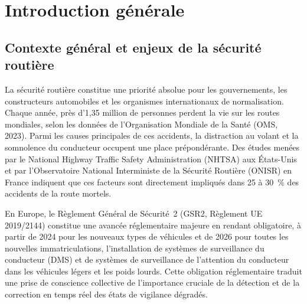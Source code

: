 \documentclass[12pt,a4paper]{report}
\begin{document}
\clearpage

\setcounter{page}{1}

\tableofcontents
\clearpage

\listoffigures
\clearpage

\listoftables
\clearpage

\lstlistoflistings
\clearpage

\setcounter{page}{1}


\chapter{Introduction g\'en\'erale}

\section{Contexte g\'en\'eral et enjeux de la s\'ecurit\'e routi\`ere}

La s\'ecurit\'e routi\`ere constitue une priorit\'e absolue pour les gouvernements, les constructeurs automobiles et les organismes internationaux de normalisation. Chaque ann\'ee, pr\`es d'1,35 million de personnes perdent la vie sur les routes mondiales, selon les donn\'ees de l'Organisation Mondiale de la Sant\'e (OMS, 2023). Parmi les causes principales de ces accidents, la distraction au volant et la somnolence du conducteur occupent une place pr\'epond\'erante. Des \'etudes men\'ees par le National Highway Traffic Safety Administration (NHTSA) aux \'Etats-Unis et par l'Observatoire National Interministe de la S\'ecurit\'e Routi\`ere (ONISR) en France indiquent que ces facteurs sont directement impliqu\'es dans 25 \`a 30~\% des accidents de la route mortels.

En Europe, le R\`eglement G\'en\'eral de S\'ecurit\'e~2 (GSR2, R\`eglement UE 2019/2144) constitue une avanc\'ee r\'eglementaire majeure en rendant obligatoire, \`a partir de 2024 pour les nouveaux types de v\'ehicules et de 2026 pour toutes les nouvelles immatriculations, l'installation de syst\`emes de surveillance du conducteur (DMS) et de syst\`emes de surveillance de l'attention du conducteur dans les v\'ehicules l\'egers et les poids lourds. Cette obligation r\'eglementaire traduit une prise de conscience collective de l'importance cruciale de la d\'etection et de la correction en temps r\'eel des \'etats de vigilance d\'egrad\'es.
\end{document}
